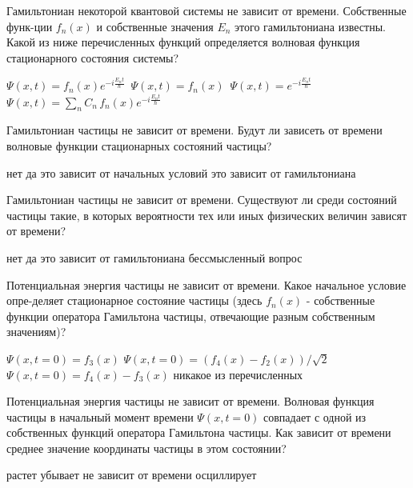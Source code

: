 \documentclass[11pt,a4paper]{exam}
\begin{document}
\begin{questions}
\question Гамильтониан некоторой квантовой системы не зависит от времени. Собственные функ-ции ${f_n}(x)$ и собственные значения ${E_n}$ этого гамильтониана известны. Какой из ниже перечисленных функций определяется волновая функция стационарного состояния системы?
\begin{choices}
\choice $\Psi (x,t) = {f_n}(x){e^{ - i\frac{{{E_n}t}}{\hbar }}}\,$   
\choice $\Psi (x,t) = {f_n}(x)\,$   
\choice $\Psi (x,t) = {e^{ - i\frac{{{E_n}t}}{\hbar }}}\,$    
\choice $\Psi (x,t) = \sum\limits_n {{C_n}} \,{f_n}(x){e^{ - i\frac{{{E_n}t}}{\hbar }}}$
\end{choices}

\question Гамильтониан частицы не зависит от времени. Будут ли зависеть от времени волновые функции стационарных состояний частицы?
\begin{choices}
\choice нет                
\choice да
\choice это зависит от начальных условий  
\choice это зависит от гамильтониана
\end{choices}

\question Гамильтониан частицы не зависит от времени. Существуют ли среди состояний частицы такие, в которых вероятности тех или иных физических величин зависят от времени?
\begin{choices}
\choice нет    
\choice да     
\choice это зависит от гамильтониана      
\choice бессмысленный вопрос
\end{choices}

\question Потенциальная энергия частицы не зависит от времени. Какое начальное условие опре-деляет стационарное состояние частицы (здесь ${f_n}(x)$ - собственные функции оператора Гамильтона частицы, отвечающие разным собственным значениям)?
\begin{choices}
\choice $\Psi (x,t = 0) = {f_3}(x)$          
\choice $\Psi (x,t = 0) = \left( {{f_4}(x) - {f_2}(x)} \right)/\sqrt 2 $
\choice $\Psi (x,t = 0) = {f_4}(x) - {f_3}(x)$        
\choice никакое из перечисленных
\end{choices}

\question Потенциальная энергия частицы не зависит от времени. Волновая функция частицы в начальный момент времени $\Psi (x,t = 0)$ совпадает с одной из собственных функций оператора Гамильтона частицы. Как зависит от времени среднее значение координаты частицы в этом состоянии?
\begin{choices}
\choice растет 
\choice убывает   
\choice не зависит от времени 
\choice осциллирует
\end{choices}


\end{questions}
\end{document}
